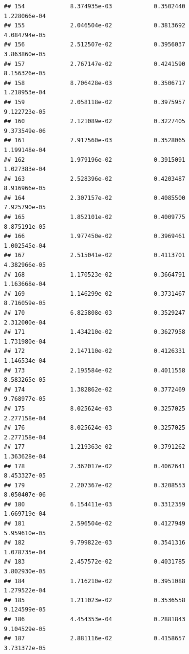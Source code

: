 \documentclass[
]{article}
\begin{document}
\begin{verbatim}
## 154             8.374935e-03            0.3502440            1.228066e-04
## 155             2.046504e-02            0.3813692            4.084794e-05
## 156             2.512507e-02            0.3956037            3.863860e-05
## 157             2.767147e-02            0.4241590            8.156326e-05
## 158             8.706428e-03            0.3506717            1.218953e-04
## 159             2.058118e-02            0.3975957            9.122723e-05
## 160             2.121089e-02            0.3227405            9.373549e-06
## 161             7.917560e-03            0.3528065            1.199148e-04
## 162             1.979196e-02            0.3915091            1.027383e-04
## 163             2.528396e-02            0.4203487            8.916966e-05
## 164             2.307157e-02            0.4085500            7.925790e-05
## 165             1.852101e-02            0.4009775            8.875191e-05
## 166             1.977450e-02            0.3969461            1.002545e-04
## 167             2.515041e-02            0.4113701            4.382966e-05
## 168             1.170523e-02            0.3664791            1.163668e-04
## 169             1.146299e-02            0.3731467            8.716059e-05
## 170             6.825808e-03            0.3529247            2.312000e-04
## 171             1.434210e-02            0.3627958            1.731980e-04
## 172             2.147110e-02            0.4126331            1.146534e-04
## 173             2.195584e-02            0.4011558            8.583265e-05
## 174             1.382862e-02            0.3772469            9.768977e-05
## 175             8.025624e-03            0.3257025            2.277158e-04
## 176             8.025624e-03            0.3257025            2.277158e-04
## 177             1.219363e-02            0.3791262            1.363628e-04
## 178             2.362017e-02            0.4062641            8.453327e-05
## 179             2.207367e-02            0.3208553            8.050407e-06
## 180             6.154411e-03            0.3312359            1.669719e-04
## 181             2.596504e-02            0.4127949            5.959610e-05
## 182             9.799822e-03            0.3541316            1.078735e-04
## 183             2.457572e-02            0.4031785            3.802930e-05
## 184             1.716210e-02            0.3951088            1.279522e-04
## 185             1.211023e-02            0.3536558            9.124599e-05
## 186             4.454353e-04            0.2881843            9.104529e-05
## 187             2.881116e-02            0.4158657            3.731372e-05

\end{verbatim}
\end{document}
